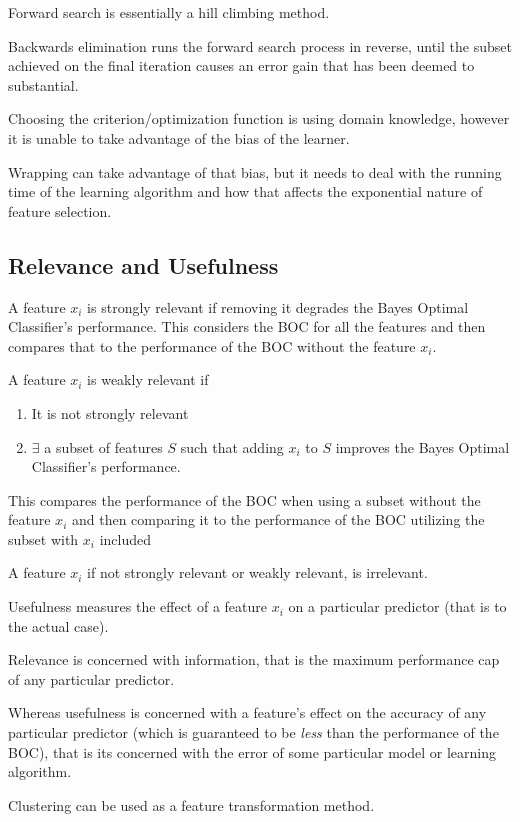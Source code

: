 \documentclass{article}
\begin{document}
Forward search is essentially a hill climbing method.

Backwards elimination runs the forward search process in reverse, until the
subset achieved on the final iteration causes an error gain that has been deemed
to substantial. 

Choosing the criterion/optimization function is using domain 
knowledge, however it is unable to take advantage of the bias of the learner.

Wrapping can take advantage of that bias, but it needs to deal with the running 
time of the learning algorithm and how that affects the exponential nature of 
feature selection.

\subsection{Relevance and Usefulness}

A feature $x_i$ is strongly relevant if removing it degrades the Bayes Optimal
Classifier's performance. This considers the BOC for all the features and then
compares that to the performance of the BOC without the feature $x_i$.

A feature $x_i$ is weakly relevant if 
\begin{enumerate}
	\item It is not strongly relevant
	\item $\exists$ a subset of features $S$ such that adding $x_i$ to $S$
		improves the Bayes Optimal Classifier's performance. 
\end{enumerate}
This compares the performance of the BOC when using a subset without the feature
$x_i$ and then comparing it to the performance of the BOC utilizing the subset 
with $x_i$ included

A feature $x_i$ if not strongly relevant or weakly relevant, is irrelevant. 

Usefulness measures the effect of a feature $x_i$ on a particular predictor 
(that is to the actual case). 

Relevance is concerned with information, that is the maximum performance cap
of any particular predictor. 

Whereas usefulness is concerned with a feature's effect on the accuracy of any
particular predictor (which is guaranteed to be \emph{less} than the performance
of the BOC), that is its concerned with the error of some particular model
or learning algorithm. 

Clustering can be used as a feature transformation method. 
\end{document}

